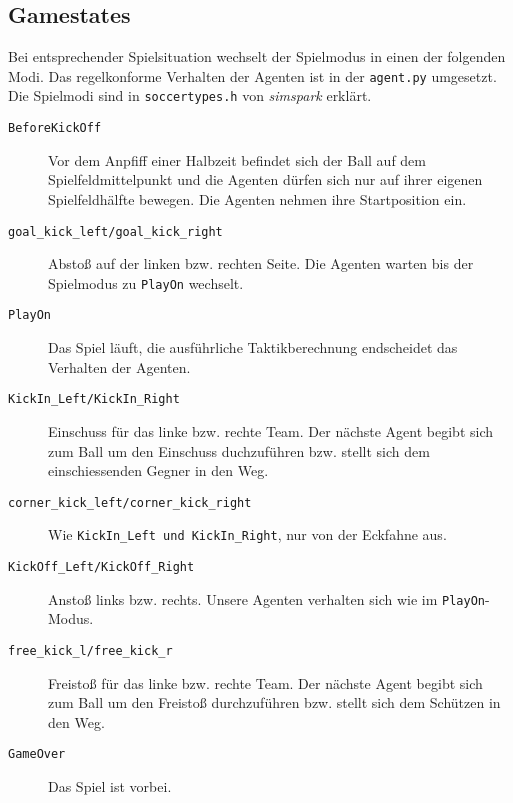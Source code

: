 \subsection{Gamestates}
Bei entsprechender Spielsituation wechselt der Spielmodus in einen der folgenden Modi. Das regelkonforme Verhalten der Agenten ist in der \texttt{agent.py} umgesetzt. Die Spielmodi sind in \texttt{soccertypes.h} von \emph{simspark} erklärt.

\begin{description}
\item[\texttt{BeforeKickOff}]
Vor dem Anpfiff einer Halbzeit befindet sich der Ball auf dem Spielfeldmittelpunkt und die Agenten dürfen sich nur auf ihrer eigenen Spielfeldhälfte bewegen. Die Agenten nehmen ihre Startposition ein.
\item[\texttt{goal\_kick\_left/goal\_kick\_right}]
Abstoß auf der linken bzw. rechten Seite. Die Agenten warten bis der Spielmodus zu \texttt{PlayOn} wechselt.
\item[\texttt{PlayOn}]
Das Spiel läuft, die ausführliche Taktikberechnung endscheidet das Verhalten der Agenten.
\item[\texttt{KickIn\_Left/KickIn\_Right}]
Einschuss für das linke bzw. rechte Team. Der nächste Agent begibt sich zum Ball um den Einschuss duchzuführen bzw. stellt sich dem einschiessenden Gegner in den Weg.
\item[\texttt{corner\_kick\_left/corner\_kick\_right}]
Wie \texttt{KickIn\_Left und KickIn\_Right}, nur von der Eckfahne aus.
\item[\texttt{KickOff\_Left/KickOff\_Right}]
Anstoß links bzw. rechts. Unsere Agenten verhalten sich wie im \texttt{PlayOn}-Modus.
\item[\texttt{free\_kick\_l/free\_kick\_r}]
Freistoß für das linke bzw. rechte Team. Der nächste Agent begibt sich zum Ball um den Freistoß durchzuführen bzw. stellt sich dem Schützen in den Weg.
\item[\texttt{GameOver}] Das Spiel ist vorbei.
\end{description}



